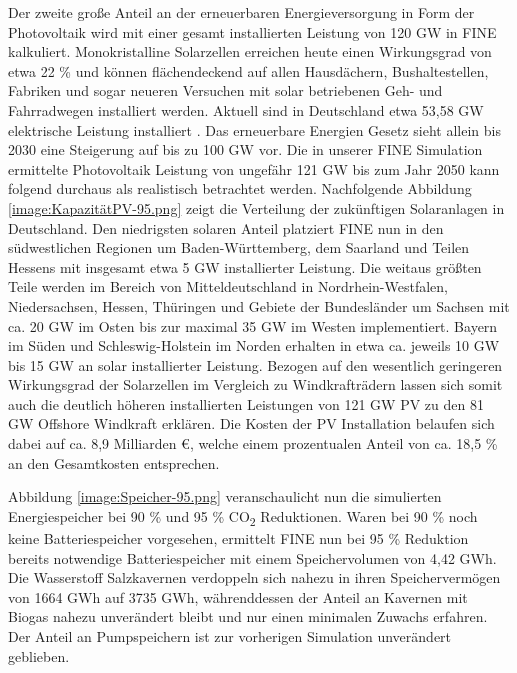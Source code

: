 Der zweite große Anteil an der erneuerbaren Energieversorgung in Form der Photovoltaik wird mit einer gesamt installierten Leistung von 120 GW in FINE kalkuliert. Monokristalline Solarzellen erreichen heute einen Wirkungsgrad von etwa 22 \% \cite{ag_2021} und können flächendeckend auf allen Hausdächern, Bushaltestellen, Fabriken und sogar neueren Versuchen mit solar betriebenen Geh- und Fahrradwegen installiert werden. Aktuell sind in Deutschland etwa 53,58 GW elektrische Leistung installiert \cite{ag_2021}. Das erneuerbare Energien Gesetz sieht allein bis 2030 eine Steigerung auf bis zu 100 GW vor.\cite{ag_2021} Die in unserer FINE Simulation ermittelte Photovoltaik Leistung von ungefähr 121 GW bis zum Jahr 2050 kann folgend durchaus als realistisch betrachtet werden. Nachfolgende Abbildung \ref{image:KapazitätPV-95.png} zeigt die Verteilung der zukünftigen Solaranlagen in Deutschland. Den niedrigsten solaren Anteil platziert FINE nun in den südwestlichen Regionen um Baden-Württemberg, dem Saarland und Teilen Hessens mit insgesamt etwa 5 GW installierter Leistung. Die weitaus größten Teile werden im Bereich von Mitteldeutschland in Nordrhein-Westfalen, Niedersachsen, Hessen, Thüringen und Gebiete der Bundesländer um Sachsen mit ca. 20 GW im Osten bis zur maximal 35 GW im Westen implementiert. Bayern im Süden und Schleswig-Holstein im Norden erhalten in etwa ca. jeweils 10 GW bis 15 GW an solar installierter Leistung. Bezogen auf den wesentlich geringeren Wirkungsgrad der Solarzellen im Vergleich zu Windkrafträdern lassen sich somit auch die deutlich höheren installierten Leistungen von 121 GW PV zu den 81 GW Offshore Windkraft erklären. Die Kosten der PV Installation belaufen sich dabei auf ca. 8,9 Milliarden €, welche einem prozentualen Anteil von ca. 18,5 \% an den Gesamtkosten entsprechen.



Abbildung \ref{image:Speicher-95.png} veranschaulicht nun die simulierten Energiespeicher bei 90 \% und 95 \% CO\textsubscript{2} Reduktionen. Waren bei 90 \% noch keine Batteriespeicher vorgesehen, ermittelt FINE nun bei 95 \% Reduktion bereits notwendige Batteriespeicher mit einem Speichervolumen von 4,42 GWh. Die Wasserstoff Salzkavernen verdoppeln sich nahezu in ihren Speichervermögen von 1664 GWh auf 3735 GWh, währenddessen der Anteil an Kavernen mit Biogas nahezu unverändert bleibt und nur einen minimalen Zuwachs erfahren. Der Anteil an Pumpspeichern ist zur vorherigen Simulation unverändert geblieben.

